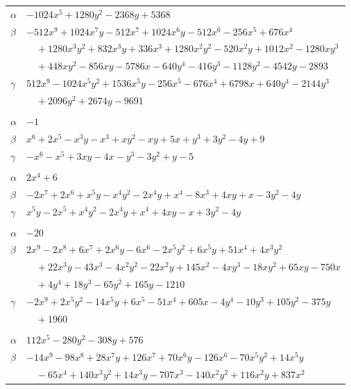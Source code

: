 \documentclass[11pt]{article}
\begin{document}
\begin{longtable}{@{}ll@{}}
$\alpha$ & $-1024x^{5}+1280y^{2}-2368y+5368$\\
$\beta$ & $-512x^{9}+1024x^{7}y-512x^{7}+1024x^{6}y-512x^{6}-256x^{5}+676x^{4}$\\
 & $\quad +1280x^{3}y^{2}+832x^{3}y+336x^{3}+1280x^{2}y^{2}-520x^{2}y+1012x^{2}-1280xy^{3}$\\
 & $\quad +448xy^{2}-856xy-5786x-640y^{4}-416y^{3}-1128y^{2}-4542y-2893$\\
$\gamma$ & $512x^{9}-1024x^{5}y^{2}+1536x^{5}y-256x^{5}-676x^{4}+6798x+640y^{4}-2144y^{3}$\\
 & $\quad +2096y^{2}+2674y-9691$\\
\addlinespace[3pt]
\multicolumn{2}{@{}l}{$\{i,j\}=\{20,21\}$, $k_{ij}=5$}\\
$\alpha$ & $-1$\\
$\beta$ & $x^{6}+2x^{5}-x^{3}y-x^{3}+xy^{2}-xy+5x+y^{3}+3y^{2}-4y+9$\\
$\gamma$ & $-x^{6}-x^{5}+3xy-4x-y^{3}-3y^{2}+y-5$\\
\addlinespace[3pt]
\multicolumn{2}{@{}l}{$\{i,j\}=\{21,25\}$, $k_{ij}=2^{3}\cdot 3$}\\
$\alpha$ & $2x^{4}+6$\\
$\beta$ & $-2x^{7}+2x^{6}+x^{5}y-x^{4}y^{2}-2x^{4}y+x^{4}-8x^{3}+4xy+x-3y^{2}-4y$\\
$\gamma$ & $x^{5}y-2x^{5}+x^{4}y^{2}-2x^{4}y+x^{4}+4xy-x+3y^{2}-4y$\\
\addlinespace[3pt]
\multicolumn{2}{@{}l}{$\{i,j\}=\{21,28\}$, $k_{ij}=2^{8}\cdot 3\cdot 5$}\\
$\alpha$ & $-20$\\
$\beta$ & $2x^{9}-2x^{8}+6x^{7}+2x^{6}y-6x^{6}-2x^{5}y^{2}+6x^{5}y+51x^{4}+4x^{3}y^{2}$\\
 & $\quad +22x^{3}y-43x^{3}-4x^{2}y^{2}-22x^{2}y+145x^{2}-4xy^{3}-18xy^{2}+65xy-750x$\\
 & $\quad +4y^{4}+18y^{3}-65y^{2}+165y-1210$\\
$\gamma$ & $-2x^{9}+2x^{5}y^{2}-14x^{5}y+6x^{5}-51x^{4}+605x-4y^{4}-10y^{3}+105y^{2}-375y$\\
 & $\quad +1960$\\
\addlinespace[3pt]
\multicolumn{2}{@{}l}{$\{i,j\}=\{21,32\}$, $k_{ij}=2^{8}$}\\
$\alpha$ & $112x^{5}-280y^{2}-308y+576$\\
$\beta$ & $-14x^{9}-98x^{8}+28x^{7}y+126x^{7}+70x^{6}y-126x^{6}-70x^{5}y^{2}+14x^{5}y$\\
 & $\quad -65x^{4}+140x^{3}y^{2}+14x^{3}y-707x^{3}-140x^{2}y^{2}+116x^{2}y+837x^{2}$\\

\end{longtable}
\end{document}
